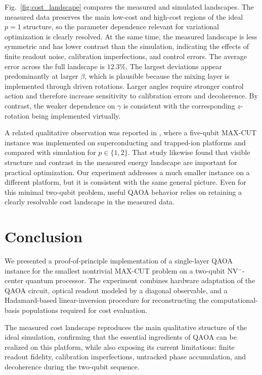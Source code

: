 \documentclass[conference]{IEEEtran}
\begin{document}
Fig.~\ref{fig:cost_landscape} compares the measured and simulated landscapes.
The measured data preserves the main low-cost and high-cost regions of the ideal
\(p=1\) structure, so the parameter dependence relevant for variational
optimization is clearly resolved. At the same time, the measured landscape is
less symmetric and has lower contrast than the simulation, indicating the
effects of finite readout noise, calibration imperfections, and control errors.
The average error across the full landscape is \(12.3\%\). The largest
deviations appear predominantly at larger \(\beta\), which is plausible because
the mixing layer is implemented through driven rotations. Larger angles require
stronger control action and therefore increase sensitivity to calibration errors
and decoherence. By contrast, the weaker dependence on \(\gamma\) is consistent
with the corresponding \(z\)-rotation being implemented virtually.

A related qualitative observation was reported in \cite{obst2023comparing},
where a five-qubit MAX-CUT instance was implemented on superconducting and
trapped-ion platforms and compared with simulation for \(p\in\{1,2\}\). That
study likewise found that visible structure and contrast in the measured energy
landscape are important for practical optimization. Our experiment addresses a
much smaller instance on a different platform, but it is consistent with the
same general picture. Even for this minimal two-qubit problem, useful QAOA
behavior relies on retaining a clearly resolvable cost landscape in the measured
data.

\section{Conclusion}

We presented a proof-of-principle implementation of a single-layer QAOA instance
for the smallest nontrivial MAX-CUT problem on a two-qubit NV\(^-\)-center
quantum processor. The experiment combines hardware adaptation of the QAOA
circuit, optical readout modeled by a diagonal observable, and a Hadamard-based
linear-inversion procedure for reconstructing the computational-basis
populations required for cost evaluation.

The measured cost landscape reproduces the main qualitative structure of the
ideal simulation, confirming that the essential ingredients of QAOA can be
realized on this platform, while also exposing its current limitations: finite
readout fidelity, calibration imperfections, untracked phase accumulation, and
decoherence during the two-qubit sequence.
\end{document}
